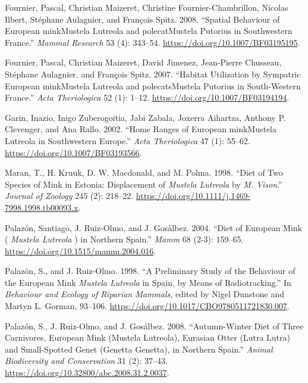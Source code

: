 \documentclass[
  letterpaper,
  DIV=11,
  numbers=noendperiod]{scrreprt}
\newlength{\cslhangindent}
\newenvironment{CSLReferences}[2] %
 {\begin{list}{}{%
  \setlength{\itemindent}{0pt}
  \setlength{\leftmargin}{0pt}
  \setlength{\parsep}{0pt}
  \ifodd #1
   \setlength{\leftmargin}{\cslhangindent}
   \setlength{\itemindent}{-1\cslhangindent}
  \fi
  \setlength{\itemsep}{#2\baselineskip}}}
 {\end{list}}
\begin{document}
\label{refs}
\begin{CSLReferences}{1}{0}
Fournier, Pascal, Christian Maizeret, Christine Fournier-Chambrillon,
Nicolas Ilbert, Stéphane Aulagnier, and François Spitz. 2008. {``Spatial
Behaviour of {European} {minkMustela} Lutreola and {polecatMustela}
Putorius in Southwestern {France}.''} \emph{Mammal Research} 53 (4):
343--54. \url{https://doi.org/10.1007/BF03195195}.

Fournier, Pascal, Christian Maizeret, David Jimenez, Jean-Pierre
Chusseau, Stéphane Aulagnier, and François Spitz. 2007. {``Habitat
Utilization by Sympatric {European} {minkMustela} Lutreola and
{polecatsMustela} Putorius in South-Western {France}.''} \emph{Acta
Theriologica} 52 (1): 1--12. \url{https://doi.org/10.1007/BF03194194}.

Garin, Inazio, Inigo Zuberogoitia, Jabi Zabala, Joxerra Aihartza,
Anthony P. Clevenger, and Ana Rallo. 2002. {``Home Ranges of {European}
{minkMustela} Lutreola in Southwestern {Europe}.''} \emph{Acta
Theriologica} 47 (1): 55--62. \url{https://doi.org/10.1007/BF03193566}.

Maran, T., H. Kruuk, D. W. Macdonald, and M. Polma. 1998. {``Diet of Two
Species of Mink in {Estonia}: Displacement of \emph{{Mustela} Lutreola}
by \emph{{M}. Vison}.''} \emph{Journal of Zoology} 245 (2): 218--22.
\url{https://doi.org/10.1111/j.1469-7998.1998.tb00093.x}.

Palazón, Santiago, J. Ruiz-Olmo, and J. Gosàlbez. 2004. {``Diet of
{European} Mink ( \emph{{Mustela} Lutreola} ) in {Northern} {Spain}.''}
\emph{Mamm} 68 (2-3): 159--65.
\url{https://doi.org/10.1515/mamm.2004.016}.

Palazón, S., and J. Ruiz-Olmo. 1998. {``A Preliminary Study of the
Behaviour of the {European} Mink \emph{{Mustela} Lutreola} in {Spain},
by Means of Radiotracking.''} In \emph{Behaviour and {Ecology} of
{Riparian} {Mammals}}, edited by Nigel Dunstone and Martyn L. Gorman,
93--106. \url{https://doi.org/10.1017/CBO9780511721830.007}.

Palazón, S., J. Ruiz-Olmo, and J. Gosálbez. 2008. {``Autumn-Winter Diet
of Three Carnivores, {European} Mink ({Mustela} Lutreola), {Eurasian}
Otter ({Lutra} Lutra) and Small-Spotted Genet ({Genetta} Genetta), in
Northern {Spain}.''} \emph{Animal Biodiversity and Conservation} 31 (2):
37--43. \url{https://doi.org/10.32800/abc.2008.31.2.0037}.


\end{CSLReferences}
\end{document}
